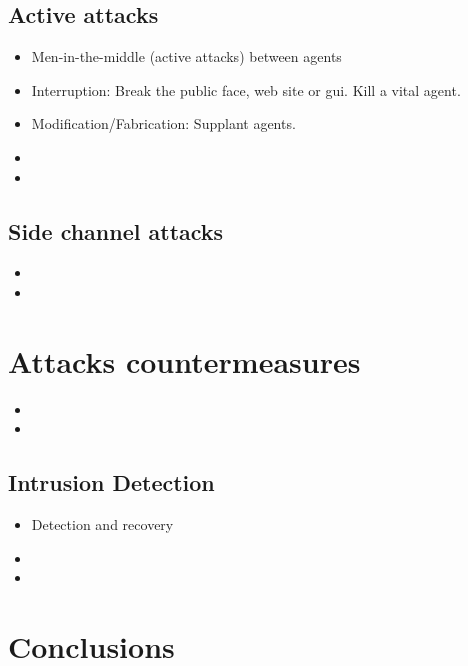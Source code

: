 \documentclass[10pt,a4paper,twoside]{llncs}
\begin{document}
%
\subsection{Active attacks \label{sec:activeAttacks}}

\begin{itemize}
 \item Men-in-the-middle (active attacks) between agents
 \item Interruption: Break the public face, web site or gui. Kill a vital agent.
 \item Modification/Fabrication: Supplant agents.
 \item 
 \item 
\end{itemize}

%
\subsection{Side channel attacks \label{sec:sideChannelAttacks}}

\begin{itemize}
 \item
 \item 
\end{itemize}

%
\section{Attacks countermeasures \label{sec:countermeasures}}

\begin{itemize}
 \item
 \item 
\end{itemize}

%
\subsection{Intrusion Detection \label{sec:intrusionDetection}}

\begin{itemize}
 \item Detection and recovery
 \item 
 \item 
\end{itemize}

%
\section{Conclusions \label{sec:conclusions}}
\end{document}
